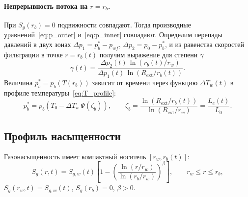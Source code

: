 \documentclass[12pt,a4paper]{article}
\newcommand{\pp}{\partial}
\newcommand{\ext}{\mathrm{ext}}
\begin{document}
\paragraph{Непрерывность потока на $r = r_b$.}
При $S_g(r_b) = 0$ подвижности совпадают. 
Тогда производные уравнений~\eqref{eq:p_outer} и~\eqref{eq:p_inner} совпадают. 
Определим перепады давлений в двух зонах $\Delta p_1 = p_b^* - p_{wf}$,
$\Delta p_2 = p_0 - p_b^*$, и из равенства скоростей фильтрации 
в точке $r=r_b(t)$ получим выражение для степени $\gamma$
\begin{equation}\label{eq:gamma_constraint}
  \gamma(t) = \frac{\Delta p_2(t)\,\ln(r_b(t)/r_w)}{\Delta p_1(t)\,\ln(R_\ext/r_b(t))}.
\end{equation}
Величина $p_b^* = p_b(T(r_b))$ зависит от времени через функцию $\Delta T_w(t)$
в профиле температуры~\eqref{eq:T_profile}:
\begin{equation}\label{eq:pb_star}
  p_b^* = p_b\!\left(T_0 - \Delta T_w\,\Psi(\zeta_b)\right),
  \qquad
  \zeta_b = \frac{\ln(R_\ext/r_b(t))}{\ln(R_\ext/r_w)} = \frac{L_e(t)}{L_0}.
\end{equation}




\subsection{Профиль насыщенности}

Газонасыщенность имеет компактный носитель $[r_w, r_b(t)]$:
\begin{equation}\label{eq:Sg_profile}
  S_g(r,t) = S_{g,w}(t)\!\left[
    1 - \left(\frac{\ln(r/r_w)}{\ln(r_b/r_w)}\right)^{\!\beta}
  \right],
  \qquad r_w \leqslant r \leqslant r_b,
\end{equation}
$S_g(r_w,t) = S_{g,w}(t)$, $S_g(r_b) = 0$, $\beta > 0$.
\end{document}
